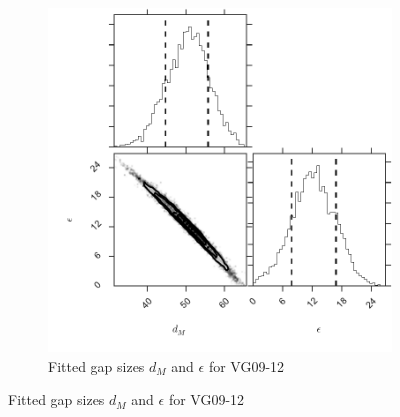 \documentclass[osajnl,preprint,showpacs,superscriptaddress,12pt]{revtex4-1} %
\begin{document}
\begin{figure}[htbp]
        \centering
        \begin{subfigure}[b]{0.5\textwidth}
              \includegraphics[width=\textwidth]{figs/VG12_twoGaps_corner.pdf}
              \caption{Fitted gap sizes $d_M$ and $\epsilon$ for VG09-12}
		\label{figVG12_corner}
        \end{subfigure}
	

\end{figure}
\end{document}
